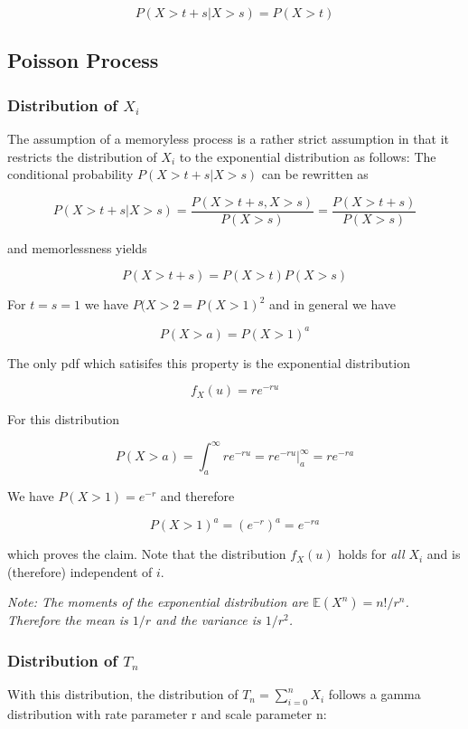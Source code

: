 \[ P(X>t+s|X>s) = P(X>t)\]

\subsection{Poisson Process}\label{poisson-process}

\subsubsection{\texorpdfstring{Distribution of
\(X_i\)}{Distribution of X\_i}}\label{distribution-of-x_i}

The assumption of a memoryless process is a rather strict assumption in that it restricts the distribution of \(X_i\) to the exponential distribution as follows: The conditional probability \(P(X>t+s|X>s)\) can be rewritten as

\[P(X>t+s|X>s) = \frac{P(X>t+s, X>s)}{P(X>s)} = \frac{P(X>t+s)}{P(X>s)}\]

and memorlessness yields

\[ P(X>t+s) = P(X>t)P(X>s) \]

For \(t=s=1\) we have \(P(X>2 = P(X>1)^2\) and in general we have

\[P(X>a) = P(X>1)^a\]

The only pdf which satisifes this property is the exponential distribution

\[ f_X(u) = r e^{-ru}\]

For this distribution

\[P(X>a) = \int_a^\infty r e^{-ru} = r e^{-ru}|_a^\infty=r e^{-ra}\]

We have \(P(X>1)=e^{-r}\) and therefore

\[ P(X>1)^a = \left( e^{-r} \right)^a = e^{-ra} \]

which proves the claim. Note that the distribution $f_X(u)$ holds for \emph{all} \(X_i\) and is (therefore) independent of \(i\).

\emph{Note: The moments of the exponential distribution are $\mathbb{E}(X^n) = n!/r^n$. Therefore the mean is \(1/r\) and the variance is \(1/r^2\).}

\subsubsection{\texorpdfstring{Distribution of \(T_n\)}{Distribution of T\_n}}\label{distribution-of-t_n}

With this distribution, the distribution of \(T_n = \sum_{i=0}^n X_i\)
follows a gamma distribution with rate parameter r and scale parameter
n:

